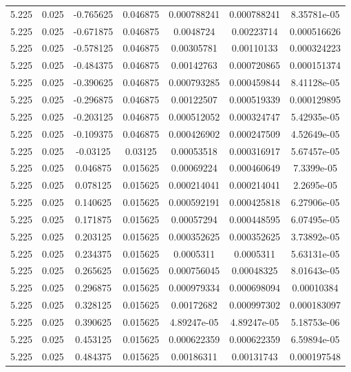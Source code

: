 \begin{table}[bh]
\begin{center}
{\begin{tabular}{ccccccc}
5.225	 & 0.025 & 	-0.765625	 & 0.046875	 & 0.000788241	 & 0.000788241	 & 8.35781e-05 \\ 
5.225	 & 0.025 & 	-0.671875	 & 0.046875	 & 0.0048724	 & 0.00223714	 & 0.000516626 \\ 
5.225	 & 0.025 & 	-0.578125	 & 0.046875	 & 0.00305781	 & 0.00110133	 & 0.000324223 \\ 
5.225	 & 0.025 & 	-0.484375	 & 0.046875	 & 0.00142763	 & 0.000720865	 & 0.000151374 \\ 
5.225	 & 0.025 & 	-0.390625	 & 0.046875	 & 0.000793285	 & 0.000459844	 & 8.41128e-05 \\ 
5.225	 & 0.025 & 	-0.296875	 & 0.046875	 & 0.00122507	 & 0.000519339	 & 0.000129895 \\ 
5.225	 & 0.025 & 	-0.203125	 & 0.046875	 & 0.000512052	 & 0.000324747	 & 5.42935e-05 \\ 
5.225	 & 0.025 & 	-0.109375	 & 0.046875	 & 0.000426902	 & 0.000247509	 & 4.52649e-05 \\ 
5.225	 & 0.025 & 	-0.03125	 & 0.03125	 & 0.00053518	 & 0.000316917	 & 5.67457e-05 \\ 
5.225	 & 0.025 & 	0.046875	 & 0.015625	 & 0.00069224	 & 0.000460649	 & 7.3399e-05 \\ 
5.225	 & 0.025 & 	0.078125	 & 0.015625	 & 0.000214041	 & 0.000214041	 & 2.2695e-05 \\ 
5.225	 & 0.025 & 	0.140625	 & 0.015625	 & 0.000592191	 & 0.000425818	 & 6.27906e-05 \\ 
5.225	 & 0.025 & 	0.171875	 & 0.015625	 & 0.00057294	 & 0.000448595	 & 6.07495e-05 \\ 
5.225	 & 0.025 & 	0.203125	 & 0.015625	 & 0.000352625	 & 0.000352625	 & 3.73892e-05 \\ 
5.225	 & 0.025 & 	0.234375	 & 0.015625	 & 0.0005311	 & 0.0005311	 & 5.63131e-05 \\ 
5.225	 & 0.025 & 	0.265625	 & 0.015625	 & 0.000756045	 & 0.00048325	 & 8.01643e-05 \\ 
5.225	 & 0.025 & 	0.296875	 & 0.015625	 & 0.000979334	 & 0.000698094	 & 0.00010384 \\ 
5.225	 & 0.025 & 	0.328125	 & 0.015625	 & 0.00172682	 & 0.000997302	 & 0.000183097 \\ 
5.225	 & 0.025 & 	0.390625	 & 0.015625	 & 4.89247e-05	 & 4.89247e-05	 & 5.18753e-06 \\ 
5.225	 & 0.025 & 	0.453125	 & 0.015625	 & 0.000622359	 & 0.000622359	 & 6.59894e-05 \\ 
5.225	 & 0.025 & 	0.484375	 & 0.015625	 & 0.00186311	 & 0.00131743	 & 0.000197548 \\ 

\end{tabular}}
\end{center}
\end{table}
